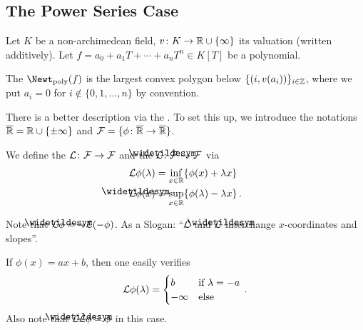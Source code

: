 \documentclass[a4paper, 10pt, oneside, DIV=9, chapterprefix=true, numbers=enddot,bibliography=totoc]{scrbook}
\begin{document}
\subsection{The Power Series Case}
Let $K$ be a non-archimedean field, $v\colon K\morphism\IR\cup\{\infty\}$ its valuation (written additively). Let $f=a_0+a_1T+\dotsb+a_nT^n\in K[T]$ be a polynomial.
\begin{defi}
	The  $\Newt_\poly(f)$ is the largest convex polygon below $\{(i,v(a_i))\}_{i\in\mathbb{Z}}$, where we put $a_i=0$ for $i\notin\{0,1,\dotsc,n\}$ by convention.
\end{defi}
There is a better description via the . To set this up, we introduce the notations $\ov{\IR}=\IR\cup\{\pm\infty\}$ and $\Ff=\{\phi\colon \ov{\IR}\morphism\ov{\IR}\}$.
\begin{defi}
	We define the  $\Ll\colon \Ff\morphism\Ff$ and the  $\snake{\Ll}\colon \Ff\morphism\Ff$ via
	\begin{align*}
		\Ll\phi(\lambda)&=\inff_{x\in\IR}\{\phi(x)+\lambda x\}\,\\
		\snake{\Ll}\phi(x)&=\sup_{x\in\IR}\{\phi(\lambda)-\lambda x\}\,.
	\end{align*}
\end{defi}
Note that $\snake{\Ll}\phi=-\Ll(-\phi)$. As a Slogan: \enquote{$\mathcal{L}$ and $\snake{\Ll}$ interchange $x$-coordinates and slopes}.
\begin{exm}\label{exm:LegendreOfLinear}
	If $\phi(x)=ax+b$, then one easily verifies
	\begin{equation*}
		\Ll\phi(\lambda)=\begin{cases}
			b & \text{if }\lambda=-a\\
			-\infty & \text{else}
		\end{cases}\,.
	\end{equation*}
	Also note that $\snake{\Ll}\Ll\phi=\phi$ in this case.
\end{exm}
\end{document}
